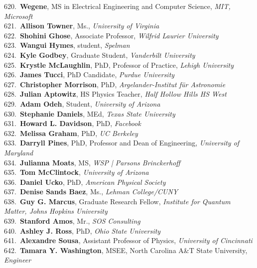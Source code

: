620.~{\bf Wegene}, MS in Electrical Engineering and Computer Science, {\sl MIT, Microsoft} \\
621.~{\bf Allison Towner}, Ms., {\sl University of Virginia} \\
622.~{\bf Shohini Ghose}, Associate Professor, {\sl Wilfrid Laurier University} \\
623.~{\bf Wangui Hymes}, student, {\sl Spelman} \\
624.~{\bf Kyle Godbey}, Graduate Student, {\sl Vanderbilt University} \\
625.~{\bf Krystle McLaughlin}, PhD, Professor of Practice, {\sl Lehigh University } \\
626.~{\bf James Tucci}, PhD Candidate, {\sl Purdue University} \\
627.~{\bf Christopher Morrison}, PhD, {\sl Argelander-Institut für Astronomie} \\
628.~{\bf Julian Aptowitz}, HS Physics Teacher, {\sl Half Hollow Hills HS West } \\
629.~{\bf Adam Odeh}, Student, {\sl University of Arizona} \\
630.~{\bf Stephanie Daniels}, MEd, {\sl Texas State University} \\
631.~{\bf Howard L. Davidson}, PhD, {\sl Facebook } \\
632.~{\bf Melissa Graham}, PhD, {\sl UC Berkeley} \\
633.~{\bf Darryll Pines}, PhD, Professor and Dean of Engineering, {\sl University of Maryland} \\
634.~{\bf Julianna Moats}, MS, {\sl WSP | Parsons Brinckerhoff } \\
635.~{\bf Tom McClintock}, {\sl University of Arizona} \\
636.~{\bf Daniel Ucko}, PhD, {\sl American Physical Society} \\
637.~{\bf Denise Sands Baez}, Ms., {\sl Lehman College/CUNY} \\
638.~{\bf Guy G. Marcus}, Graduate Research Fellow, {\sl Institute for Quantum Matter, Johns Hopkins University} \\
639.~{\bf Stanford Amos}, Mr., {\sl SOS Consulting } \\
640.~{\bf Ashley J. Ross}, PhD, {\sl Ohio State University} \\
641.~{\bf Alexandre Sousa}, Assistant Professor of Physics, {\sl University of Cincinnati} \\
642.~{\bf Tamara Y. Washington}, MSEE, North Carolina A\&T State University, {\sl Engineer} \\
